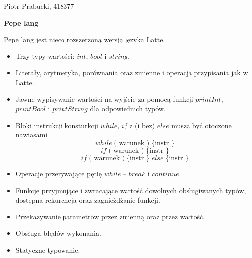 \documentclass[12pt]{article}
\begin{document}
Piotr Prabucki, 418377


\vspace{0.2cm}
\begin{center}
\vspace{1mm}
 \Large \textbf{Pepe lang}
\vspace{0.7cm}
\end{center}


\noindent
Pepe lang jest nieco rozszerzoną wersją języka Latte.

\begin{itemize}
    \item Trzy typy wartości: $int$, $bool$ i $string$.
    \item Literały, arytmetyka, porównania oraz zmienne i operacja przypisania jak w Latte.
    \item Jawne wypisywanie wartości na wyjście za pomocą funkcji $printInt$, $printBool$ i $printString$ dla odpowiednich typów.
    \item Bloki instrukcji konsturkcji $while$, $if$ z (i bez) $else$ muszą być otoczone nawiasami
        $$ while \; \text{( warunek )} \; \text{\{ instr \}} $$
        $$ if \; \text{( warunek )} \; \text{\{ instr \}} $$
        $$ if \; \text{( warunek )} \; \text{\{ instr \}} \; else \; \text{\{ instr \}}$$
    \item Operacje przerywające pętlę $while$ -- $break$ i $continue$.
    \item Funkcje przyjmujące i zwracające wartość dowolnych obsługiwanych typów, dostępna rekurencja oraz zagnieżdżanie funkcji.
    \item Przekazywanie parametrów przez zmienną oraz przez wartość.
    \item Obsługa błędów wykonania.
    \item Statyczne typowanie.
\end{itemize}
\end{document}

